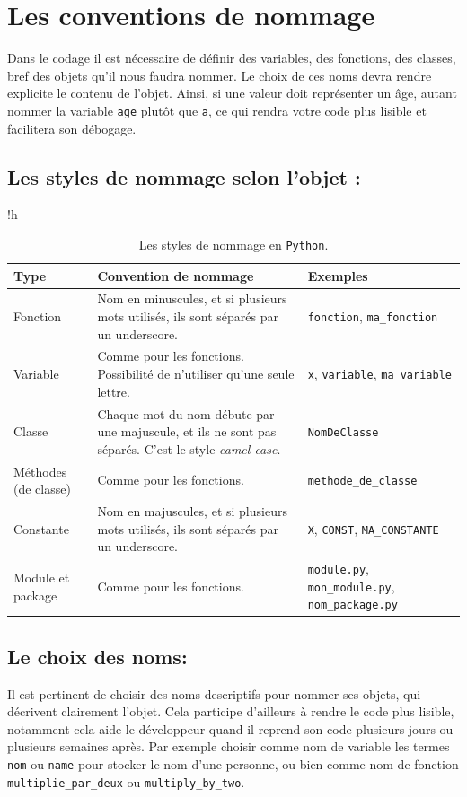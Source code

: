 \documentclass[a4paper,11pt]{book}
\begin{document}
\section{Les conventions de nommage}
Dans le codage il est nécessaire de définir des variables, des fonctions, des classes, bref des objets qu'il nous faudra nommer. Le choix de ces noms devra rendre explicite le contenu de l'objet. Ainsi, si une valeur doit représenter un âge, autant nommer la variable \texttt{age} plutôt que \texttt{a}, ce qui rendra votre code plus lisible et facilitera son débogage.

\subsection*{Les styles de nommage selon l'objet :}
\begin{table}{!h}
\begin{center}
\begin{tabular}{|p{2cm}|p{7cm}|p{3cm}|}
\hline
\textbf{Type} & \textbf{Convention de nommage} & \textbf{Exemples} \\
\hline
Fonction & Nom en minuscules, et si plusieurs mots utilisés, ils sont séparés par un underscore. & \texttt{fonction}, \texttt{ma\_fonction} \\
\hline
Variable & Comme pour les fonctions. Possibilité de n'utiliser qu'une seule lettre. & \texttt{x}, \texttt{variable}, \texttt{ma\_variable} \\
\hline
Classe & Chaque mot du nom débute par une majuscule, et ils ne sont pas séparés. C'est le style \textit{camel case}. & \texttt{NomDeClasse} \\
\hline
Méthodes (de classe) & Comme pour les fonctions. & \texttt{methode\_de\_classe} \\
\hline
Constante & Nom en majuscules, et si plusieurs mots utilisés, ils sont séparés par un underscore. & \texttt{X}, \texttt{CONST}, \texttt{MA\_CONSTANTE} \\
\hline
Module  et package & Comme pour les fonctions. & \texttt{module.py}, \texttt{mon\_module.py}, \texttt{nom\_package.py} \\
\hline
\end{tabular}
\caption{Les styles de nommage en \texttt{Python}.}
\end{center}
\end{table}
\medskip

\subsection*{Le choix des noms:}
Il est pertinent de choisir des noms descriptifs pour nommer ses objets, qui décrivent clairement l'objet. Cela participe d'ailleurs à rendre le code plus lisible, notamment cela aide le développeur quand il reprend son code plusieurs jours ou plusieurs semaines après. Par exemple choisir comme nom de variable les termes \texttt{nom} ou \texttt{name} pour stocker le nom d'une personne, ou bien comme nom de fonction \texttt{multiplie\_par\_deux} ou \texttt{multiply\_by\_two}.
\medskip
\end{document}
